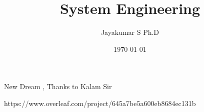 \documentclass{beamer}
\title[Systems Engineering]{System Engineering } %
\author{Jayakumar S Ph.D} %
\institute[Ajeenkya DY Patil University] %
{
Ajeenkya DY Patil University \\ %
\medskip
\textit{jk@jkuse.com} %
}
\date{\today} %
\begin{document}
\begin{frame}
\titlepage %
\end{frame}



  

\begin{frame}
\Huge{\centerline{New Dream , Thanks to Kalam Sir}}https://www.overleaf.com/project/645a7be5a600eb8684ec131b
\end{frame}
\end{document}
